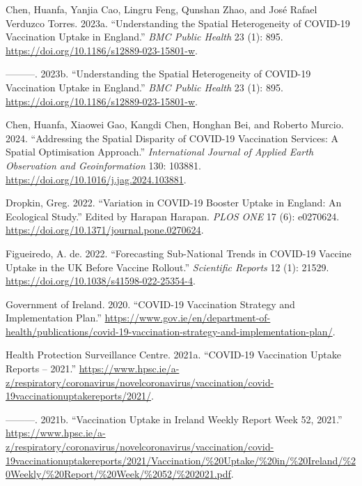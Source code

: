 \documentclass{article}
\newlength{\cslhangindent}
\newenvironment{CSLReferences}[2] %
 {\begin{list}{}{%
  \setlength{\itemindent}{0pt}
  \setlength{\leftmargin}{0pt}
  \setlength{\parsep}{0pt}
  \ifodd #1
   \setlength{\leftmargin}{\cslhangindent}
   \setlength{\itemindent}{-1\cslhangindent}
  \fi
  \setlength{\itemsep}{#2\baselineskip}}}
 {\end{list}}
\begin{document}
\label{refs}
\begin{CSLReferences}{1}{0}
Chen, Huanfa, Yanjia Cao, Lingru Feng, Qunshan Zhao, and José Rafael
Verduzco Torres. 2023a. {``Understanding the Spatial Heterogeneity of
COVID-19 Vaccination Uptake in England.''} \emph{BMC Public Health} 23
(1): 895. \url{https://doi.org/10.1186/s12889-023-15801-w}.

---------. 2023b. {``Understanding the Spatial Heterogeneity of
{COVID}-19 Vaccination Uptake in {England}.''} \emph{BMC Public Health}
23 (1): 895. \url{https://doi.org/10.1186/s12889-023-15801-w}.

Chen, Huanfa, Xiaowei Gao, Kangdi Chen, Honghan Bei, and Roberto Murcio.
2024. {``Addressing the Spatial Disparity of COVID-19 Vaccination
Services: A Spatial Optimisation Approach.''} \emph{International
Journal of Applied Earth Observation and Geoinformation} 130: 103881.
\url{https://doi.org/10.1016/j.jag.2024.103881}.

Dropkin, Greg. 2022. {``Variation in {COVID}-19 Booster Uptake in
{England}: {An} Ecological Study.''} Edited by Harapan Harapan.
\emph{PLOS ONE} 17 (6): e0270624.
\url{https://doi.org/10.1371/journal.pone.0270624}.

Figueiredo, A. de. 2022. {``Forecasting Sub-National Trends in COVID-19
Vaccine Uptake in the UK Before Vaccine Rollout.''} \emph{Scientific
Reports} 12 (1): 21529.
\url{https://doi.org/10.1038/s41598-022-25354-4}.

Government of Ireland. 2020. {``COVID-19 Vaccination Strategy and
Implementation Plan.''}
\url{https://www.gov.ie/en/department-of-health/publications/covid-19-vaccination-strategy-and-implementation-plan/}.

Health Protection Surveillance Centre. 2021a. {``COVID-19 Vaccination
Uptake Reports -- 2021.''}
\url{https://www.hpsc.ie/a-z/respiratory/coronavirus/novelcoronavirus/vaccination/covid-19vaccinationuptakereports/2021/}.

---------. 2021b. {``Vaccination Uptake in Ireland Weekly Report Week
52, 2021.''}
\url{https://www.hpsc.ie/a-z/respiratory/coronavirus/novelcoronavirus/vaccination/covid-19vaccinationuptakereports/2021/Vaccination/\%20Uptake/\%20in/\%20Ireland/\%20Weekly/\%20Report/\%20Week/\%2052/\%202021.pdf}.


\end{CSLReferences}
\end{document}
